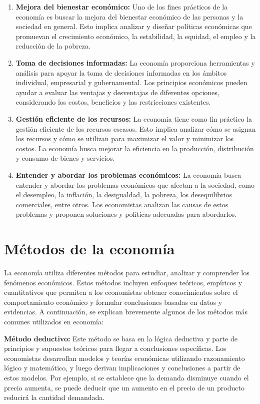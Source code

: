 \documentclass[
  jou,
  floatsintext,
  longtable,
  a4paper,
  nolmodern,
  notxfonts,
  notimes,
  12pt,
  colorlinks=true,linkcolor=blue,citecolor=blue,urlcolor=blue]{apa7}
\begin{document}
\begin{enumerate}
\def\labelenumi{\arabic{enumi}.}
\item
  \textbf{Mejora del bienestar económico:} Uno de los fines prácticos de
  la economía es buscar la mejora del bienestar económico de las
  personas y la sociedad en general. Esto implica analizar y diseñar
  políticas económicas que promuevan el crecimiento económico, la
  estabilidad, la equidad, el empleo y la reducción de la pobreza.
\item
  \textbf{Toma de decisiones informadas:} La economía proporciona
  herramientas y análisis para apoyar la toma de decisiones informadas
  en los ámbitos individual, empresarial y gubernamental. Los principios
  económicos pueden ayudar a evaluar las ventajas y desventajas de
  diferentes opciones, considerando los costos, beneficios y las
  restricciones existentes.
\item
  \textbf{Gestión eficiente de los recursos:} La economía tiene como fin
  práctico la gestión eficiente de los recursos escasos. Esto implica
  analizar cómo se asignan los recursos y cómo se utilizan para
  maximizar el valor y minimizar los costos. La economía busca mejorar
  la eficiencia en la producción, distribución y consumo de bienes y
  servicios.
\item
  \textbf{Entender y abordar los problemas económicos:} La economía
  busca entender y abordar los problemas económicos que afectan a la
  sociedad, como el desempleo, la inflación, la desigualdad, la pobreza,
  los desequilibrios comerciales, entre otros. Los economistas analizan
  las causas de estos problemas y proponen soluciones y políticas
  adecuadas para abordarlos.
\end{enumerate}

\section{Métodos de la economía}\label{muxe9todos-de-la-economuxeda}

La economía utiliza diferentes métodos para estudiar, analizar y
comprender los fenómenos económicos. Estos métodos incluyen enfoques
teóricos, empíricos y cuantitativos que permiten a los economistas
obtener conocimientos sobre el comportamiento económico y formular
conclusiones basadas en datos y evidencias. A continuación, se explican
brevemente algunos de los métodos más comunes utilizados en economía:

\textbf{Método deductivo:} Este método se basa en la lógica deductiva y
parte de principios y supuestos teóricos para llegar a conclusiones
específicas. Los economistas desarrollan modelos y teorías económicas
utilizando razonamiento lógico y matemático, y luego derivan
implicaciones y conclusiones a partir de estos modelos. Por ejemplo, si
se establece que la demanda disminuye cuando el precio aumenta, se puede
deducir que un aumento en el precio de un producto reducirá la cantidad
demandada.
\end{document}
